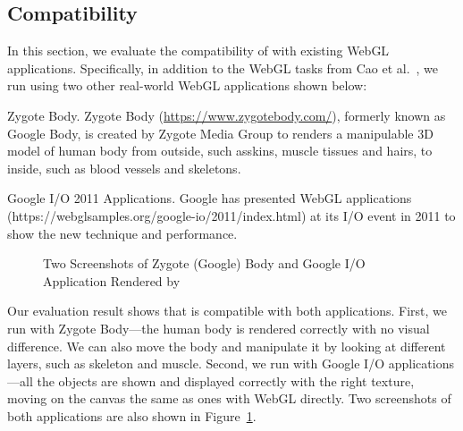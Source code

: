 

\subsection{Compatibility}

In this section, we evaluate the compatibility of \sys with existing WebGL applications.  Specifically, in addition to the WebGL tasks from Cao et al.~\cite{ndss17cao}, we run \sys using two other real-world WebGL applications shown below:

\begin{icompact}
\item {Zygote Body.}  Zygote Body (\url{https://www.zygotebody.com/}), formerly known as Google Body, is created by Zygote Media Group to renders a manipulable 3D model of human body from outside, such asskins, muscle tissues and hairs, to inside, such as blood vessels and skeletons. 

\item {Google I/O 2011 Applications.}  Google has presented WebGL applications (https://webglsamples.org/google-io/2011/index.html) at its I/O event in 2011 to show the new technique and performance. 
\end{icompact} 


\begin{figure}[t]
	\centering
	\vspace{-0.1in}%
	\caption{Two Screenshots of Zygote (Google) Body and Google I/O Application Rendered by \sys} \label{fig:screenshot} \vspace{-0.2in}
\end{figure}


Our evaluation result shows that \sys is compatible with both applications.  First, we run \sys with Zygote Body---the human body is rendered correctly with no visual difference.  We can also move the body and manipulate it by looking at different layers, such as skeleton and muscle. Second, we run \sys with Google I/O applications---all the objects are shown and displayed correctly with the right texture, moving on the canvas the same as ones with WebGL directly.  Two screenshots of both applications are also shown in Figure~\ref{fig:screenshot}.







